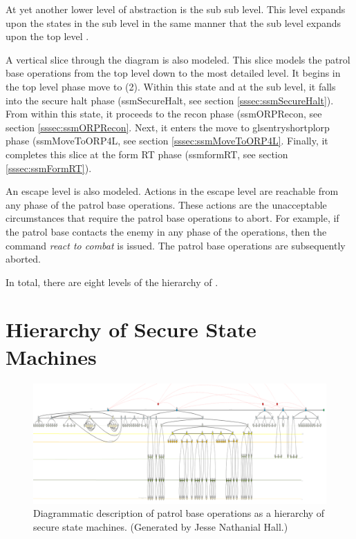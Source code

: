 \documentclass[../../main/main.tex]{subfiles}
\begin{document}
At yet another lower level of abstraction is the sub sub level.  This level expands upon the states in the sub level  in the same manner that the sub level expands upon the top level .  

A vertical slice through the diagram is also modeled.  This slice models the patrol base operations from the top level down to the most detailed level.  It begins in the top level phase move to  (2). Within this state and at the sub level, it falls into the secure halt phase (ssmSecureHalt, see section \ref{sssec:ssmSecureHalt}).  From within this state, it proceeds to the recon phase (ssmORPRecon, see section \ref{sssec:ssmORPRecon}.  Next, it enters the move to glsentryshortpl{orp} phase (ssmMoveToORP4L, see section \ref{sssec:ssmMoveToORP4L}.  Finally, it completes this slice at the form RT phase  (ssmformRT, see section \ref{sssec:ssmFormRT}).

An escape level is also modeled.  Actions in the escape level are reachable from any phase of the patrol base operations.  These actions are the unacceptable circumstances that require the patrol base operations to abort.  For example, if the patrol base contacts the enemy in any phase of the operations, then the command \textit{react to combat} is issued.  The patrol base operations are subsequently aborted.  

In total, there are eight levels of the hierarchy of .

\section{Hierarchy of Secure State Machines}
\begin{figure}[h]
\includegraphics[width=\textwidth]{../figures/overalldiagramsquashed.png}
\caption{\label{overalldiagramsquashed}Diagrammatic description of patrol base operations as a hierarchy of secure state machines.  (Generated by Jesse Nathanial Hall.)}
\end{figure}
\end{document}
